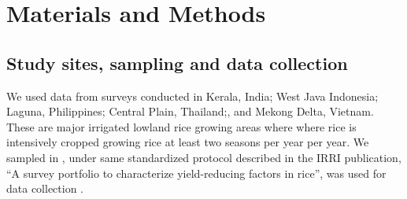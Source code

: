 \section*{Materials and Methods}

\subsection*{Study sites, sampling and data collection}
We used data from surveys conducted in Kerala, India; West Java Indonesia; Laguna, Philippines; Central Plain, Thailand;, and Mekong Delta, Vietnam. These are major irrigated lowland rice growing areas where where rice is intensively cropped growing rice at least two seasons per year per year. We sampled in , under same standardized protocol described in the IRRI publication, ``A survey portfolio to characterize yield-reducing factors in rice'', was used for data collection \cite{Savarysurvey2009}.